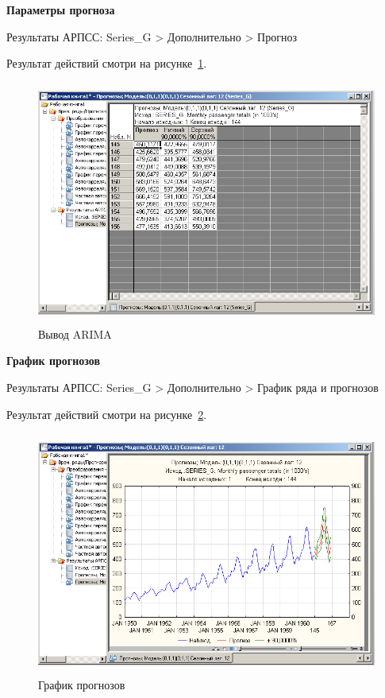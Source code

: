 
\newpage

\begin{center}
  \textbf{Параметры прогноза}
\end{center}

Результаты АРПСС: Series\_G
> Дополнительно > Прогноз

Результат действий смотри на рисунке~\ref{fig:14}.

\begin{figure}[!h]
  \centering

  \includegraphics[height=8cm]
  {inc/Series_G/14.PNG}

  \caption{Вывод ARIMA}

  \label{fig:14}
\end{figure}

\begin{center}
  \textbf{График прогнозов}
\end{center}

Результаты АРПСС: Series\_G
> Дополнительно > График ряда и прогнозов

Результат действий смотри на рисунке~\ref{fig:15}.

\begin{figure}[!h]
  \centering

  \includegraphics[height=8cm]
  {inc/Series_G/15.PNG}

  \caption{График прогнозов}

  \label{fig:15}
\end{figure}

